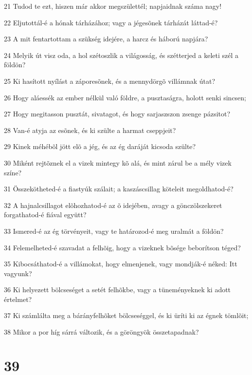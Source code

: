 \par 21 Tudod te ezt, hiszen már akkor megszülettél; napjaidnak száma nagy!
\par 22 Eljutottál-é a hónak tárházához; vagy a jégesõnek tárházát láttad-é?
\par 23 A mit fentartottam a szükség idejére, a harcz és háború napjára?
\par 24 Melyik út visz oda, a hol szétoszlik a világosság, és szétterjed a keleti szél a földön?
\par 25 Ki hasított nyílást a záporesõnek, és a mennydörgõ villámnak útat?
\par 26 Hogy aláessék az ember nélkül való földre, a pusztaságra, holott senki sincsen;
\par 27 Hogy megitasson pusztát, sivatagot, és hogy sarjaszszon zsenge pázsitot?
\par 28 Van-é atyja az esõnek, és ki szülte a harmat cseppjeit?
\par 29 Kinek méhébõl jött elõ a jég, és az ég daráját kicsoda szülte?
\par 30 Miként rejtõznek el a vizek mintegy kõ alá, és mint zárul be a mély vizek színe?
\par 31 Összekötheted-é a fiastyúk szálait; a kaszáscsillag köteleit megoldhatod-é?
\par 32 A hajnalcsillagot elõhozhatod-é az õ idejében, avagy a gönczölszekeret forgathatod-é fiával együtt?
\par 33 Ismered-é az ég törvényeit, vagy te határozod-é meg uralmát a földön?
\par 34 Felemelheted-é szavadat a felhõig, hogy a vizeknek bõsége beborítson téged?
\par 35 Kibocsáthatod-é a villámokat, hogy elmenjenek, vagy mondják-é néked: Itt vagyunk?
\par 36 Ki helyezett bölcseséget a setét felhõkbe, vagy a tüneményeknek ki adott értelmet?
\par 37 Ki számlálta meg a bárányfelhõket bölcseséggel, és ki üríti ki az égnek tömlõit;
\par 38 Mikor a por híg sárrá változik, és a göröngyök összetapadnak?

\chapter{39}

